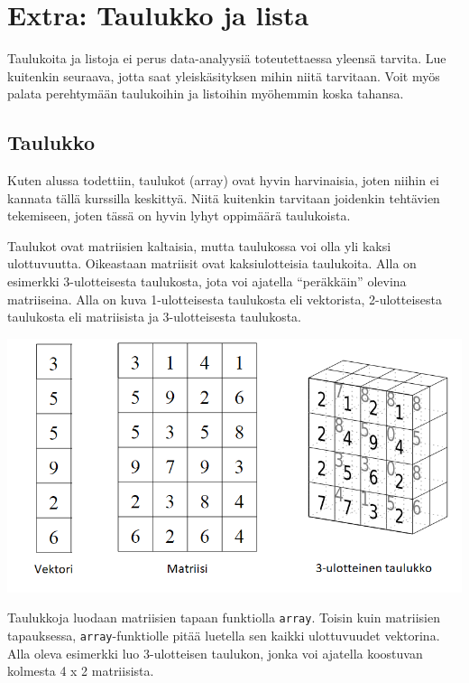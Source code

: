 \documentclass[
]{book}
\begin{document}
\hypertarget{extra-taulukko-ja-lista}{%
\section{Extra: Taulukko ja lista}\label{extra-taulukko-ja-lista}}

Taulukoita ja listoja ei perus data-analyysiä toteutettaessa yleensä tarvita. Lue kuitenkin seuraava, jotta saat yleiskäsityksen mihin niitä tarvitaan. Voit myös palata perehtymään taulukoihin ja listoihin myöhemmin koska tahansa.

\hypertarget{array}{%
\subsection{Taulukko}\label{array}}

Kuten alussa todettiin, taulukot (array) ovat hyvin harvinaisia, joten niihin ei kannata tällä kurssilla keskittyä. Niitä kuitenkin tarvitaan joidenkin tehtävien tekemiseen, joten tässä on hyvin lyhyt oppimäärä taulukoista.

Taulukot ovat matriisien kaltaisia, mutta taulukossa voi olla yli kaksi ulottuvuutta. Oikeastaan matriisit ovat kaksiulotteisia taulukoita. Alla on esimerkki 3-ulotteisesta taulukosta, jota voi ajatella ``peräkkäin'' olevina matriiseina. Alla on kuva 1-ulotteisesta taulukosta eli vektorista, 2-ulotteisesta taulukosta eli matriisista ja 3-ulotteisesta taulukosta.

\includegraphics{files/array.png}

Taulukkoja luodaan matriisien tapaan funktiolla \texttt{array}. Toisin kuin matriisien tapauksessa, \texttt{array}-funktiolle pitää luetella sen kaikki ulottuvuudet vektorina. Alla oleva esimerkki luo 3-ulotteisen taulukon, jonka voi ajatella koostuvan kolmesta 4 x 2 matriisista.
\end{document}
